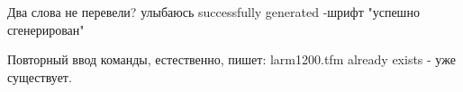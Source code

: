 \documentclass[12pt]{article}
\begin{document}
Два слова не перевели? улыбаюсь successfully generated -шрифт "успешно сгенерирован"

Повторный ввод команды, естественно, пишет: larm1200.tfm already exists - уже существует.
\end{document}
